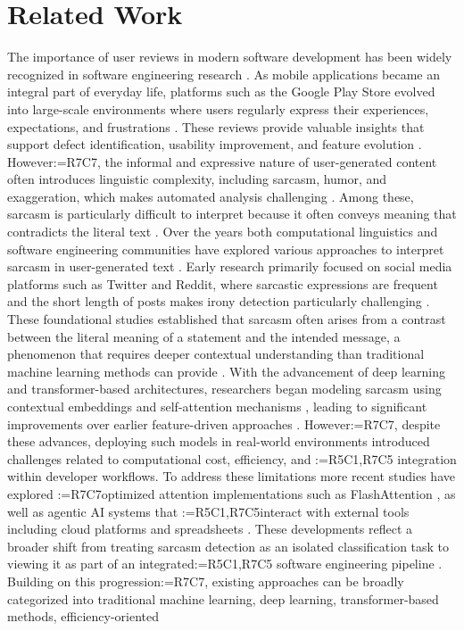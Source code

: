 \documentclass[a4paper,fleqn]{cas-sc}
\makeatletter
\newif\iftracked
\newcommand{\rv@setcolour}[1]{%
  \IfStrEq{#1}{R7C7}{\color{rvEdit}}{%
    \IfSubStr{#1}{R5}{\IfSubStr{#1}{R7}{\color{rvBoth}}{\color{rvFive}}}{\color{rvSeven}}}}
\newcommand{\rv@tag}[1]{\textsuperscript{\sffamily\bfseries\scriptsize[\StrSubstitute{#1}{,}{, }]}\,}
\newcommand{\rv@recordone}[1]{%
  \edef\rv@i{#1}%
  \ifcsdef{rv@n@\rv@i}{}{\csgdef{rv@n@\rv@i}{0}}%
  \csxdef{rv@n@\rv@i}{\the\numexpr\csuse{rv@n@\rv@i}+1\relax}%
  \begingroup\edef\@currentlabel{\rv@i}\label{rv:\rv@i:\csuse{rv@n@\rv@i}}\endgroup}
\newcommand{\rv@record}[1]{\@for\rv@id:=#1\do{\expandafter\rv@recordone\expandafter{\rv@id}}}
\DeclareRobustCommand{\rcdel}[2]{\rv@record{#1}\iftracked{\rv@setcolour{#1}\rv@tag{#1}\rv@strike{#2}}\else\unskip\fi}
\DeclareRobustCommand{\rcrep}[3]{\rv@record{#1}\iftracked{\rv@setcolour{#1}\rv@tag{#1}\rv@strike{#2} #3}\else#3\fi}
\DeclareRobustCommand{\rce}[1]{\rv@record{R7C7}\iftracked{\color{rvEdit}#1}\else#1\fi}
\makeatother
\begin{document}
\section{Related Work}
\label{sec:related}

The importance of user reviews in modern software development has been widely recognized in software engineering research \citep{putri2025sarcasm}. As mobile applications became an integral part of everyday life, platforms such as the Google Play Store evolved into large-scale environments where users regularly express their experiences, expectations, and frustrations \citep{pagano2013user,zhou2025toxic}. These reviews provide valuable insights that support defect identification, usability improvement, and feature evolution \citep{ciurumelea2017analyzing,delima2024opinion}. However\rce{,} the informal and expressive nature of user-generated content often introduces linguistic complexity, including sarcasm, humor, and exaggeration, which makes automated analysis challenging \citep{young2020user,joshi2015harnessing}. Among these, sarcasm is particularly difficult to interpret because it often conveys meaning that contradicts the literal text \citep{davidov2010semi,gonzalez2011identifying}. Over the years both computational linguistics and software engineering communities have explored various approaches to interpret sarcasm in user-generated text \citep{riloff2013sarcasm}. Early research primarily focused on social media platforms such as Twitter and Reddit, where sarcastic expressions are frequent and the short length of posts makes irony detection particularly challenging \citep{rajadesingan2015sarcasm}. These foundational studies established that sarcasm often arises from a contrast between the literal meaning of a statement and the intended message, a phenomenon that requires deeper contextual understanding than traditional machine learning methods can provide \citep{kenyondean2018sentiment,appel2016hybrid}. With the advancement of deep learning and transformer-based architectures, researchers began modeling sarcasm using contextual embeddings and self-attention mechanisms \citep{devlin2019bert}, leading to significant improvements over earlier feature-driven approaches \citep{galal2024arabic,wang2026guard}. However\rce{,} despite these advances, deploying such models in real-world environments introduced challenges related to computational cost, efficiency, and \rcdel{R5C1,R7C5}{real-time} integration within developer workflows. To address these limitations more recent studies have explored \rcrep{R7C7}{optimized architectures}{optimized attention implementations} such as FlashAttention \citep{dao2022flashattention,dao2024flashattention2}, as well as agentic AI systems that \rcrep{R5C1,R7C5}{can interact autonomously}{interact} with external tools including cloud platforms and spreadsheets \citep{yao2023react}. These developments reflect a broader shift from treating sarcasm detection as an isolated classification task to viewing it as part of an integrated\rcdel{R5C1,R7C5}{, intelligent} software engineering pipeline \citep{schick2023toolformer}. Building on this progression\rce{,} existing approaches can be broadly categorized into traditional machine learning, deep learning, transformer-based methods, efficiency-oriented 
\end{document}

